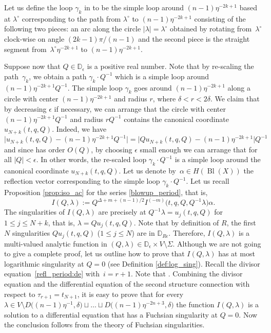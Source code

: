 \documentclass[10pt,a4paper]{article}
\numberwithin{equation}{section}
\begin{document}
Let us define the loop $\gamma_k$ in  to be the simple loop around $(n-1)\eta^{-2k+1}$ based at $\lambda^\circ$ corresponding to the path from $\lambda^\circ$ to $(n-1)\eta^{-2k+1}$ consisting of the following two pieces: an arc along the circle $|\lambda|=\lambda^\circ$ obtained by rotating from~$\lambda^\circ$ clock-wise on angle $(2k-1)\pi/(n-1)$ and the second piece is the straight segment from~$\lambda^\circ \eta^{-2k+1}$ to $(n-1)\eta^{-2k+1}$.

Suppose now that $Q\in \mathbb{D}_\epsilon$ is a positive real number. Note that by re-scaling the path~$\gamma_k$, we obtain a path $\gamma_k\cdot Q^{-1}$ which is a simple loop around $(n-1)\eta^{-2k+1}Q^{-1}$. The simple loop $\gamma_k$ goes around $(n-1)\eta^{-2k+1}$ along a circle with center $(n-1)\eta^{-2k+1}$ and radius $r$, where $\delta<r<2\delta$. We claim that by decreasing $\epsilon$ if necessary, we can arrange that the circle with center $(n-1)\eta^{-2k+1} Q^{-1}$ and radius $r Q^{-1}$ contains the canonical coordinate $u_{N+k}(t,q,Q)$. Indeed, we have
\[
\big|u_{N+k}(t,q,Q)-(n-1) \eta^{-2k+1} Q^{-1}\big|=
\big|Qu_{N+k}(t,q,Q)-(n-1) \eta^{-2k+1}\big| Q^{-1}
\]
and since  has order $O(Q)$, by choosing $\epsilon$ small enough we can arrange that  for all $|Q|<\epsilon$. In other words, the re-scaled loop $\gamma_k \cdot Q^{-1}$ is a simple loop around the canonical coordinate $u_{N+k}(t,q,Q)$. Let us denote by~${\alpha\in H(\operatorname{Bl}(X))}$ the reflection vector corresponding to the simple loop $\gamma_k \cdot Q^{-1}$. Let us recall Proposition \ref{prop:iso_ac} for the series \eqref{blowup_period}, that is,
\[%
I(Q,\lambda):= Q^{\Delta+m+(n-1)/2} I^{(-m)}\big(t,q,Q,Q^{-1}\lambda\big)\alpha.
\]
The singularities of $I(Q,\lambda)$ are precisely at $Q^{-1}\lambda = u_j(t,q,Q)$ for $1\leq j\leq N+k$, that is, $\lambda=Q u_j(t,q,Q)$. Note that by definition of $R$, the first $N$ singularities $Qu_j(t,q,Q)$ (${1\leq j\leq N}$) are in $\mathbb{D}_{R\epsilon}$. Therefore, $I(Q,\lambda)$ is a multi-valued analytic function in $(Q,\lambda)\in \mathbb{D}_\epsilon \times V\setminus{\Sigma}$. Although we are not going to give a complete proof, let us outline how to prove that $I(Q,\lambda)$ has at most logarithmic singularity at $Q=0$ (see Definition \ref{def:log_sing}). Recall the divisor equation~\eqref{refl_period:de} with~${i=r+1}$. Note that . Combining the divisor equation and the differential equation of the second structure connection with respect to $\tau_{r+1}=t_{N+1}$, it is easy to prove that for every $\lambda\in V\setminus{D\big((n-1)\eta^{-1},\delta\big)\sqcup\dots\sqcup D\big((n-1)\eta^{-2n+3},\delta\big)}$ the function $I(Q,\lambda)$ is a solution to a differential equation that has a Fuchsian singularity at $Q=0$. Now the conclusion follows from the theory of Fuchsian singularities.
\end{document}
